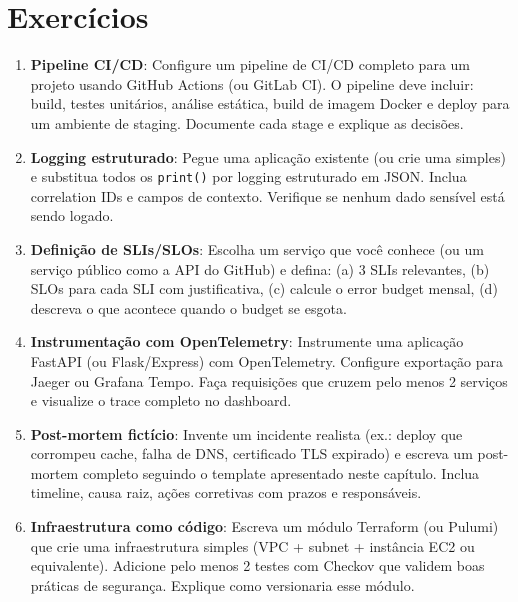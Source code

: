 \section*{Exercícios}

\begin{enumerate}
    \item \textbf{Pipeline CI/CD}: Configure um pipeline de CI/CD completo para
    um projeto usando GitHub Actions (ou GitLab CI). O pipeline deve incluir:
    build, testes unitários, análise estática, build de imagem Docker e deploy
    para um ambiente de staging. Documente cada stage e explique as decisões.

    \item \textbf{Logging estruturado}: Pegue uma aplicação existente (ou crie
    uma simples) e substitua todos os \texttt{print()} por logging estruturado em
    JSON. Inclua correlation IDs e campos de contexto. Verifique se nenhum dado
    sensível está sendo logado.

    \item \textbf{Definição de SLIs/SLOs}: Escolha um serviço que você conhece
    (ou um serviço público como a API do GitHub) e defina: (a) 3 SLIs relevantes,
    (b) SLOs para cada SLI com justificativa, (c) calcule o error budget mensal,
    (d) descreva o que acontece quando o budget se esgota.

    \item \textbf{Instrumentação com OpenTelemetry}: Instrumente uma aplicação
    FastAPI (ou Flask/Express) com OpenTelemetry. Configure exportação para Jaeger
    ou Grafana Tempo. Faça requisições que cruzem pelo menos 2 serviços e
    visualize o trace completo no dashboard.

    \item \textbf{Post-mortem fictício}: Invente um incidente realista (ex.:
    deploy que corrompeu cache, falha de DNS, certificado TLS expirado) e escreva
    um post-mortem completo seguindo o template apresentado neste capítulo.
    Inclua timeline, causa raiz, ações corretivas com prazos e responsáveis.

    \item \textbf{Infraestrutura como código}: Escreva um módulo Terraform (ou
    Pulumi) que crie uma infraestrutura simples (VPC + subnet + instância EC2
    ou equivalente). Adicione pelo menos 2 testes com Checkov que validem boas
    práticas de segurança. Explique como versionaria esse módulo.


\end{enumerate}
